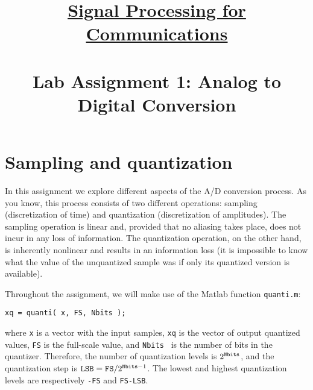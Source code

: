 \documentclass[11pt]{article}
\begin{document}
\setlength{\baselineskip}{16pt}
\title{\underline{Signal Processing for Communications} \\~\\ Lab Assignment 1: Analog to Digital Conversion }
\author{}
\date{}
\maketitle
\noindent

\vspace*{-1.5cm}
\section{Sampling and quantization}
In this assignment we explore different aspects of the A/D conversion process. As you know, this process
consists of two different operations: sampling (discretization of time) and quantization (discretization 
of amplitudes). The sampling operation is linear and, provided that no aliasing takes place, does not incur in
any loss of information. The quantization operation, on the other hand, is inherently nonlinear and
results in an information loss (it is impossible to know what the value of the unquantized sample was 
if only its quantized version is available).

Throughout the assignment, we will make use of the Matlab function {\tt quanti.m}:
\begin{center}
{\tt xq = quanti( x, FS, Nbits ); }
\end{center}
where {\tt x} is a vector with the input samples, {\tt xq} is the vector of output quantized values, {\tt FS} is the
full-scale value, and {\tt Nbits } is the number of bits in the quantizer. Therefore, the number of quantization levels is $2^\text{\tt Nbits}$, and the quantization step is $\text{\tt LSB} = \text{\tt FS}/2^{\text{\tt Nbits}-1}$. The lowest and highest quantization levels are respectively {\tt -FS} and {\tt FS-LSB}. 
\end{document}
